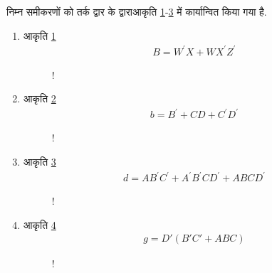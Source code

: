 निम्न समीकरणों  को  तर्क द्वार के द्वाराआकृति \ref{fig:gates_B}-\ref{fig:gates_d} में कार्यान्वित किया गया है.
\renewcommand{\theequation}{\theenumi}
\renewcommand{\thefigure}{\theenumi}
\begin{enumerate}[label=\thesection.\arabic*.,ref=\thesection.\theenumi]

\item आकृति \ref{fig:gates_B}
\begin{align}
B=W^{\prime}X+WX^{\prime}Z^{\prime}
\end{align}
\begin{figure}[!ht]
\begin{center}
\resizebox {\columnwidth} {!} {

}
\end{center}
\caption{}
\label{fig:gates_B}
\end{figure}
\item आकृति \ref{fig:gates_b}
\begin{align}
b=B^{\prime}+CD+C^{\prime}D^{\prime}
\end{align}
\begin{figure}[!ht]
\begin{center}
\resizebox {\columnwidth} {!} {

}
\end{center}
\caption{}
\label{fig:gates_b}
\end{figure}
%
\item आकृति \ref{fig:gates_d}
\begin{align}
d = AB^{\prime}C^{\prime}+A^{\prime}B^{\prime}CD^{\prime}+ABCD^{\prime}
\end{align}
\begin{figure}[!ht]
\begin{center}
\resizebox {\columnwidth} {!} {

}
\end{center}
\caption{}
\label{fig:gates_d}
\end{figure}
%
%
\item  आकृति \ref{fig:gates_g}
\begin{align}
%
g = D'(B'C'+ABC)
\end{align}
\begin{figure}[!ht]
\begin{center}
\resizebox {\columnwidth} {!} {

}
\end{center}
\caption{}
\label{fig:gates_g}
\end{figure}
\end{enumerate}
